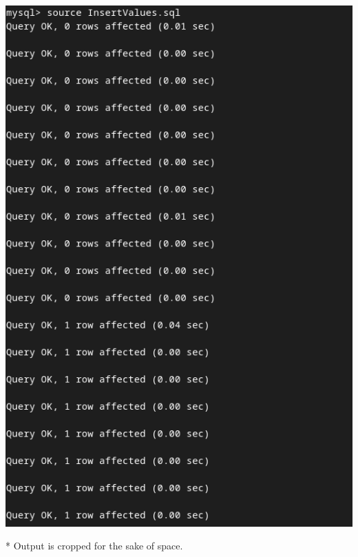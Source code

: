 \documentclass{article}
\begin{document}
\section{}
\begin{center}
    \includegraphics[scale=0.6]{5.png}
\end{center}
* Output is cropped for the sake of space.
\end{document}
